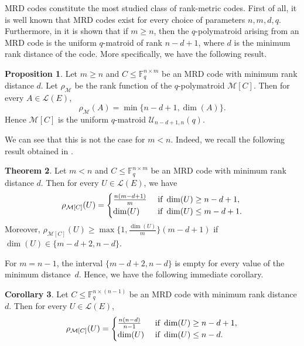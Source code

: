 \documentclass[a4paper,11pt,reqno]{amsart}
\theoremstyle{definition}
\newtheorem{theorem}{Theorem}[section]
\newtheorem{corollary}[theorem]{{{Corollary}}}%
\newtheorem{proposition}[theorem]{{{Proposition}}}
\newcommand{\mM}{\mathcal{M}}
\newcommand{\mL}{\mathcal{L}}
\newcommand{\mU}{\mathcal{U}}
\newcommand{\F}{\mathbb F}
\begin{document}
{MRD codes constitute the most studied class of rank-metric codes. First of all, it is well known that MRD codes exist for every choice of parameters $n,m,d,q$. Furthermore, in \cite{gorla2019rank} it is shown that if $m\geq n$, then the $q$-polymatroid arising from an MRD
code is the uniform $q$-matroid of rank $n - d + 1$, where $d$ is the minimum rank distance of the code. More specifically, we have the following result.

\begin{proposition}\cite[Cor. 6.6]{gorla2019rank} Let $m\geq n$ and $C \leq \F_q^{n\times m}$ be an MRD code with minimum rank distance $d$. Let $\rho_\mM$ be the rank function of the $q$-polymatroid $\mM[C]$. Then for every $A\in\mL(E)$,
$$\rho_\mM(A) = \min\{n-d+1, \dim(A)\}.$$
Hence $\mM[C]$ is the uniform $q$-matroid $\mU_{n-d+1,n}(q)$.
    
\end{proposition}


We can see that this is not the case for $m<n$. Indeed, we recall the following result obtained in \cite{gluesing2022q}.

\begin{theorem}\cite[Theorem 3.10]{gluesing2022q}
    Let $m<n$ and $C \leq \F_q^{n\times m}$ be an MRD code with minimum rank distance $d$.  Then for every $U\in\mL(E)$,  we have
    $$\rho_{\mM[C]}(U) = 
    \begin{cases}
        \frac{n(m-d+1)}{m} & \textnormal{ if } \dim(U)\geq n-d+1, \\
        \dim(U) & \textnormal{ if } \dim(U)\leq m-d+1.
    \end{cases}$$
    Moreover, $\rho_{\mM[C]}(U)\geq \max\{1,\frac{\dim(U)}{m}\}(m-d+1)$ if $\dim(U)\in\{m-d+2, n-d\}$.
\end{theorem}
	
For $m=n-1$, the interval $\{m-d+2, n-d\}$ is empty for every value of the minimum distance~$d$. Hence, we have the following immediate corollary.

\begin{corollary}\label{cor:rank_function_special_MRD}
    Let $C \leq \F_q^{n\times (n-1)}$ be an MRD code with minimum rank distance $d$.  Then for every $U\in\mL(E)$, 
    $$\rho_{\mM[C]}(U) = 
    \begin{cases}
        \frac{n(n-d)}{n-1} & \textnormal{ if } \dim(U)\geq n-d+1, \\
        \dim(U) & \textnormal{ if } \dim(U)\leq n-d.
    \end{cases}$$
\end{corollary}

}
\end{document}
